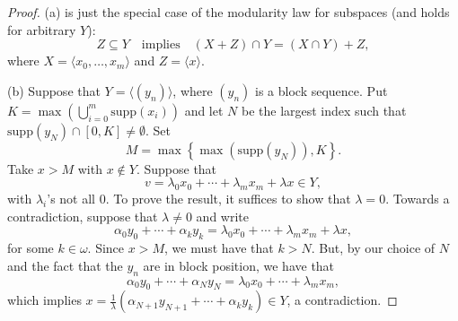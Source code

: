 \documentclass[11pt]{amsart}
\theoremstyle{definition}
\theoremstyle{remark}
\newcommand{\supp}{\mathrm{supp}}
\renewcommand{\1}{\mathbf{1}}
\begin{document}
\begin{proof}
	(a) is just the special case of the modularity law for subspaces (and holds for arbitrary $Y$):
	\[
		Z\subseteq Y \quad\text{implies}\quad (X+Z)\cap Y=(X\cap Y)+Z,
	\]
	where $X=\langle x_0,\ldots,x_m\rangle$ and $Z=\langle x\rangle$.
	
	(b) Suppose that $Y=\langle (y_n)\rangle$, where $(y_n)$ is a block sequence. Put $K=\max(\bigcup_{i=0}^m\supp(x_i))$ and let $N$ be the largest index such that $\supp(y_N)\cap[0,K]\neq\emptyset$. Set	
	\[
		M=\max\left\{\max(\supp(y_N)),K\right\}.
	\]
	Take $x>M$ with $x\notin Y$.  Suppose that
	\[
		v=\lambda_0x_0+\cdots+\lambda_m x_m+\lambda x\in Y,
	\]
	with $\lambda_i$'s not all $0$. To prove the result, it suffices to show that $\lambda=0$. Towards a contradiction, suppose that $\lambda\neq 0$ and write
	\[
		\alpha_0y_0+\cdots+\alpha_k y_k=\lambda_0x_0+\cdots+\lambda_m x_m+\lambda x,
	\]
	for some $k\in\omega$. Since $x>M$, we must have that $k>N$. But, by our choice of $N$ and the fact that the $y_n$ are in block position, we have that
	\[
		\alpha_0y_0+\cdots+\alpha_N y_N=\lambda_0x_0+\cdots+\lambda_m x_m,
	\]
	which implies $x=\frac{1}{\lambda}(\alpha_{N+1}y_{N+1}+\cdots+\alpha_k y_k)\in Y$, a contradiction.
%	
%	
\end{proof}
\end{document}
